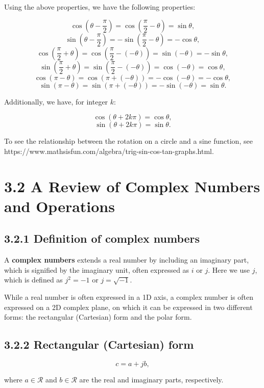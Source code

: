 \documentclass[11pt]{article}
\begin{document}
Using the above properties, we have the following properties:

\[\cos\left(\theta - \frac{\pi}{2}\right) = \cos\left(\frac{\pi}{2} - \theta\right) = \sin\theta,\]
\[\sin\left(\theta - \frac{\pi}{2}\right) = -\sin\left(\frac{\pi}{2} - \theta\right) = -\cos\theta,\]
\[\cos\left(\frac{\pi}{2} + \theta\right) = \cos\left(\frac{\pi}{2} - (-\theta)\right) = \sin(-\theta) = -\sin\theta,\]
\[\sin\left(\frac{\pi}{2} + \theta\right) = \sin\left(\frac{\pi}{2} - (-\theta)\right) = \cos(-\theta) = \cos\theta,\]
\[\cos(\pi - \theta) = \cos(\pi + (-\theta)) = -\cos(-\theta) = -\cos\theta,\]
\[\sin(\pi - \theta) = \sin(\pi + (-\theta)) = -\sin(-\theta) = \sin\theta.\]

Additionally, we have, for integer $k$:

\[\cos(\theta + 2k\pi) = \cos\theta,\]
\[\sin(\theta + 2k\pi) = \sin\theta.\]

To see the relationship between the rotation on a circle and a sine function, see https://www.mathsisfun.com/algebra/trig-sin-cos-tan-graphs.html.

\section*{3.2 A Review of Complex Numbers and Operations}

\subsection*{3.2.1 Definition of complex numbers}

A \textbf{complex numbers} extends a real number by including an imaginary part, which is signified by the imaginary unit, often expressed as $i$ or $j$. Here we use $j$, which is defined as $j^2 = -1$ or $j = \sqrt{-1}$.

While a real number is often expressed in a 1D axis, a complex number is often expressed on a 2D complex plane, on which it can be expressed in two different forms: the rectangular (Cartesian) form and the polar form.

\subsection*{3.2.2 Rectangular (Cartesian) form}

\[c = a + jb,\]

where $a \in \mathcal{R}$ and $b \in \mathcal{R}$ are the real and imaginary parts, respectively.
\end{document}

